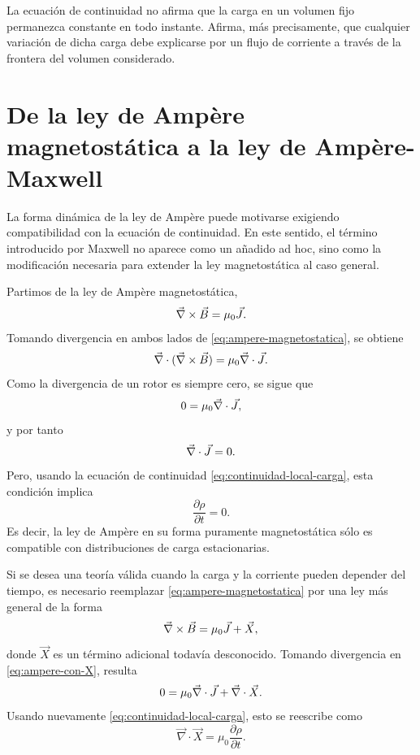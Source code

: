 \documentclass[../main.tex]{subfiles}
\begin{document}
\begin{cuidado}
La ecuación de continuidad no afirma que la carga en un volumen fijo permanezca constante en todo instante. Afirma, más precisamente, que cualquier variación de dicha carga debe explicarse por un flujo de corriente a través de la frontera del volumen considerado.
\end{cuidado}

\section{De la ley de Ampère magnetostática a la ley de Ampère-Maxwell}

La forma dinámica de la ley de Ampère puede motivarse exigiendo compatibilidad con la ecuación de continuidad. En este sentido, el término introducido por Maxwell no aparece como un añadido ad hoc, sino como la modificación necesaria para extender la ley magnetostática al caso general.

Partimos de la ley de Ampère magnetostática,
\begin{equation}
    \vec\nabla\times\vec{B}=\mu_0\vec{J}.
    \label{eq:ampere-magnetostatica}
\end{equation}
Tomando divergencia en ambos lados de \eqref{eq:ampere-magnetostatica}, se obtiene
\begin{equation*}
    \vec\nabla\cdot(\vec\nabla\times\vec{B})=\mu_0\vec\nabla\cdot\vec{J}.
\end{equation*}
Como la divergencia de un rotor es siempre cero, se sigue que
\begin{equation*}
    0=\mu_0\vec\nabla\cdot\vec{J},
\end{equation*}
y por tanto
\begin{equation*}
    \vec\nabla\cdot\vec{J}=0.
\end{equation*}
Pero, usando la ecuación de continuidad \eqref{eq:continuidad-local-carga}, esta condición implica
\begin{equation*}
    \frac{\partial \rho}{\partial t}=0.
\end{equation*}
Es decir, la ley de Ampère en su forma puramente magnetostática sólo es compatible con distribuciones de carga estacionarias.

Si se desea una teoría válida cuando la carga y la corriente pueden depender del tiempo, es necesario reemplazar \eqref{eq:ampere-magnetostatica} por una ley más general de la forma
\begin{equation}
    \vec\nabla\times\vec{B}=\mu_0\vec{J}+\vec X,
    \label{eq:ampere-con-X}
\end{equation}
donde $\vec X$ es un término adicional todavía desconocido. Tomando divergencia en \eqref{eq:ampere-con-X}, resulta
\begin{equation*}
    0=\mu_0\vec\nabla\cdot\vec{J}+\vec\nabla\cdot\vec X.
\end{equation*}
Usando nuevamente \eqref{eq:continuidad-local-carga}, esto se reescribe como
\begin{equation}
    \vec\nabla\cdot\vec X=\mu_0\frac{\partial \rho}{\partial t}.
    \label{eq:divX}
\end{equation}
\end{document}
